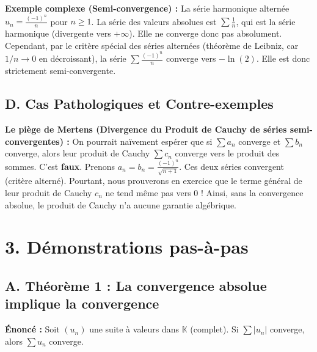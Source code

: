 \documentclass[12pt,a4paper]{report}
\begin{document}
\textbf{Exemple complexe (Semi-convergence) :}
La série harmonique alternée $u_n = \frac{(-1)^n}{n}$ pour $n \ge 1$.
La série des valeurs absolues est $\sum \frac{1}{n}$, qui est la série harmonique (divergente vers $+\infty$). Elle ne converge donc pas absolument. Cependant, par le critère spécial des séries alternées (théorème de Leibniz, car $1/n \to 0$ en décroissant), la série $\sum \frac{(-1)^n}{n}$ converge vers $-\ln(2)$. Elle est donc strictement semi-convergente.

\subsection{D. Cas Pathologiques et Contre-exemples}

\textbf{Le piège de Mertens (Divergence du Produit de Cauchy de séries semi-convergentes) :}
On pourrait naïvement espérer que si $\sum a_n$ converge et $\sum b_n$ converge, alors leur produit de Cauchy $\sum c_n$ converge vers le produit des sommes.
C'est \textbf{faux}. Prenons $a_n = b_n = \frac{(-1)^n}{\sqrt{n+1}}$. Ces deux séries convergent (critère alterné). Pourtant, nous prouverons en exercice que le terme général de leur produit de Cauchy $c_n$ ne tend même pas vers 0 ! Ainsi, sans la convergence absolue, le produit de Cauchy n'a aucune garantie algébrique.

\section{3. Démonstrations pas-à-pas}

\subsection{A. Théorème 1 : La convergence absolue implique la convergence}

\textbf{Énoncé :} Soit $(u_n)$ une suite à valeurs dans $\mathbb{K}$ (complet). Si $\sum |u_n|$ converge, alors $\sum u_n$ converge.
\end{document}
